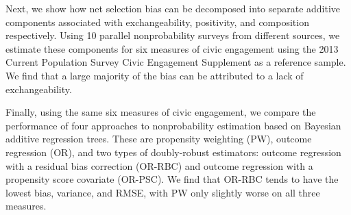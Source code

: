 Next, we show how net selection bias can be decomposed into separate additive components associated with exchangeability, positivity, and composition respectively. Using 10 parallel nonprobability surveys from different sources, we estimate these components for six measures of civic engagement using the 2013 Current Population Survey Civic Engagement Supplement as a reference sample. We find that a large majority of the bias can be attributed to a lack of exchangeability. 

Finally, using the same six measures of civic engagement, we compare the performance of four approaches to nonprobability estimation based on Bayesian additive regression trees. These are propensity weighting (PW), outcome regression (OR), and two types of doubly-robust estimators: outcome regression with a residual bias correction (OR-RBC) and outcome regression with a propensity score covariate (OR-PSC). We find that OR-RBC tends to have the lowest bias, variance, and RMSE, with PW only slightly worse on all three measures. 


